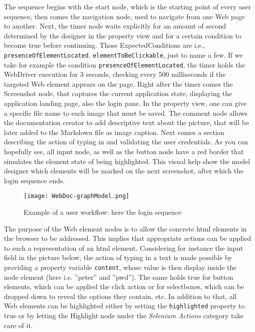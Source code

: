 The sequence begins with the start node, which is the starting point of every user sequence, then comes the navigation node, used to navigate from one Web page to another. Next, the timer node waits explicitly for an amount of second  determined by the designer in the property view and for a certain condition to become true before continuing. Those ExpectedConditions are i.e., \lstinline{presenceOfElementLocated}, \lstinline{elementToBeClickable}, just to name a few. If we take for example the condition \lstinline{presenceOfElementLocated}, the timer holds the WebDriver execution for 3 seconds, checking every 500 milliseconds if the targeted Web element appears on the page. Right after the timer comes the Screenshot node, that captures the current application state, displaying the application landing page, also the login pane. In the property view, one can give a specific file name to each image that must be saved. The comment node allows the documentation creator to add descriptive text about the picture, that will be later added to the Markdown file as image caption. Next comes a section describing the action of typing in and validating the user credentials. As you can hopefully see, all input node, as well as the button node have a red border that simulates the element state of being highlighted. This visual help show the model designer which elements will be marked on the next screenshot, after which the login sequence ends.
\begin{figure}[h]
    \centering
    \texttt{[image: WebDoc-graphModel.png]}
    \caption{Example of a user workflow: here the login sequence}
    \label{fig:loginSeq}
\end{figure}

The purpose of the Web element nodes is to allow the concrete \gls*{html} elements in the browser to be addressed. This implies that appropriate actions can be applied to such a representation of an \gls*{html} element. Considering for instance the input field in the picture below, the action of typing in a text is made possible by providing a property variable \lstinline{content}, whose value is then display inside the node element (here i.e. ''peter'' and ''pwd''). The same holds true for button elements, which can be applied the click action or for selectboxes, which can be dropped down to reveal the options they contain, etc. In addition to that, all Web elements can be highlighted either by setting the \lstinline{highlighted} property to true or by letting the Highlight node under the \textit{Selenium Actions} category take care of it. 


